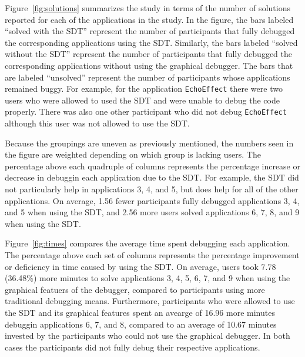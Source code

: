 \documentclass[11pt, letterpaper, onecolumn]{article}
\begin{document}
Figure~\ref{fig:solutions} summarizes the study in terms of the number
of solutions  reported for each of  the applications in  the study. In
the figure,  the bars  labeled ``solved with  the SDT''  represent the
number   of  participants  that   fully  debugged   the  corresponding
applications  using  the SDT.  Similarly,  the  bars labeled  ``solved
without  the SDT''  represent the  number of  participants  that fully
debugged  the corresponding applications  without using  the graphical
debugger. The bars that  are labeled ``unsolved'' represent the number
of participants  whose applications  remained buggy. For  example, for
the application \texttt{EchoEffect} there were two users who were
allowed to used the SDT and were unable to debug the code
properly. There was also one other participant who did not debug
\texttt{EchoEffect} although this user was not allowed to use the SDT.

Because the groupings are  uneven as previously mentioned, the numbers
seen in  the figure are weighted  depending on which  group is lacking
users. The  percentage above each quadruple of  columns represents the
percentage increase  or decrease in  debuggin each application  due to
the  SDT.   For  example,  the   SDT  did  not  particularly  help  in
applications  3,  4,  and 5,  but  does  help  for  all of  the  other
applications.   On  average, 1.56  fewer  participants fully  debugged
applications  3, 4,  and 5  when using  the SDT,  and 2.56  more users
solved applications  6, 7,  8, and  9 when using  the SDT.

Figure~\ref{fig:times} compares the  average time spent debugging each
application. The  percentage above each set of  columns represents the
percentage improvement or deficiency in  time caused by using the SDT.
On  average,   users  took  7.78  (36.48\%)  more   minutes  to  solve
applications 3, 4, 5, 6, 7, and 9 when using the graphical featuers of
the  debugger,   compared  to  participants   using  more  traditional
debugging means. Furthermore, participants who were allowed to use the
SDT and its graphical features  spent an avearge of 16.96 more minutes
debuggin applications  6, 7,  and 8, compared  to an average  of 10.67
minutes invested by  the participants who could not  use the graphical
debugger. In  both cases  the participants did  not fully  debug their
respective applications.
\end{document}
